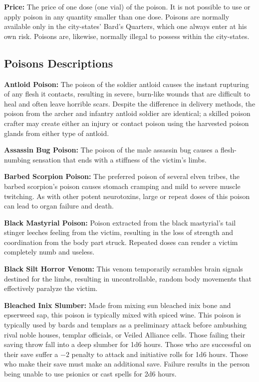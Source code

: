 \textbf{Price:} The price of one dose (one vial) of the poison. It is not possible to use or apply poison in any quantity smaller than one dose. Poisons are normally available only in the city-states' Bard's Quarters, which one always enter at his own risk. Poisons are, likewise, normally illegal to possess within the city-states.

\subsection{Poisons Descriptions}
\textbf{Antloid Poison:} The poison of the soldier antloid causes the instant rupturing of any flesh it contacts, resulting in severe, burn-like wounds that are difficult to heal and often leave horrible scars. Despite the difference in delivery methods, the poison from the archer and infantry antloid soldier are identical; a skilled poison crafter may create either an injury or contact poison using the harvested poison glands from either type of antloid.

\textbf{Assassin Bug Poison:} The poison of the male assassin bug causes a flesh-numbing sensation that ends with a stiffness of the victim's limbs.

\textbf{Barbed Scorpion Poison:} The preferred poison of several elven tribes, the barbed scorpion's poison causes stomach cramping and mild to severe muscle twitching. As with other potent neurotoxins, large or repeat doses of this poison can lead to organ failure and death.

\textbf{Black Mastyrial Poison:} Poison extracted from the black mastyrial's tail stinger leeches feeling from the victim, resulting in the loss of strength and coordination from the body part struck. Repeated doses can render a victim completely numb and useless.

\textbf{Black Silt Horror Venom:} This venom temporarily scrambles brain signals destined for the limbs, resulting in uncontrollable, random body movements that effectively paralyze the victim.

\textbf{Bleached Inix Slumber:} Made from mixing sun bleached inix bone and epserweed sap, this poison is typically mixed with spiced wine. This poison is typically used by bards and templars as a preliminary attack before ambushing rival noble houses, templar officials, or Veiled Alliance cells. Those failing their saving throw fall into a deep slumber for 1d6 hours. Those who are successful on their save suffer a $-2$ penalty to attack and initiative rolls for 1d6 hours. Those who make their save must make an additional save. Failure results in the person being unable to use psionics or cast spells for 2d6 hours.


